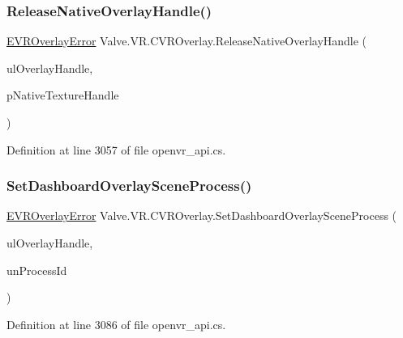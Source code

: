 \subsubsection{\texorpdfstring{ReleaseNativeOverlayHandle()}{ReleaseNativeOverlayHandle()}}
{\footnotesize\ttfamily \mbox{\hyperlink{namespace_valve_1_1_v_r_aaee5c5144f42b7969d45b854f51b0c18}{E\+V\+R\+Overlay\+Error}} Valve.\+V\+R.\+C\+V\+R\+Overlay.\+Release\+Native\+Overlay\+Handle (\begin{DoxyParamCaption}\item[{ulong}]{ul\+Overlay\+Handle,  }\item[{Int\+Ptr}]{p\+Native\+Texture\+Handle }\end{DoxyParamCaption})}



Definition at line 3057 of file openvr\+\_\+api.\+cs.

\mbox{\label{class_valve_1_1_v_r_1_1_c_v_r_overlay_ae2953273d370a8ecbbac3513392cfc09}} 
\subsubsection{\texorpdfstring{SetDashboardOverlaySceneProcess()}{SetDashboardOverlaySceneProcess()}}
{\footnotesize\ttfamily \mbox{\hyperlink{namespace_valve_1_1_v_r_aaee5c5144f42b7969d45b854f51b0c18}{E\+V\+R\+Overlay\+Error}} Valve.\+V\+R.\+C\+V\+R\+Overlay.\+Set\+Dashboard\+Overlay\+Scene\+Process (\begin{DoxyParamCaption}\item[{ulong}]{ul\+Overlay\+Handle,  }\item[{uint}]{un\+Process\+Id }\end{DoxyParamCaption})}



Definition at line 3086 of file openvr\+\_\+api.\+cs.

\mbox{\label{class_valve_1_1_v_r_1_1_c_v_r_overlay_aec3ec57c3684d36a2b446efab4f0811b}} 
